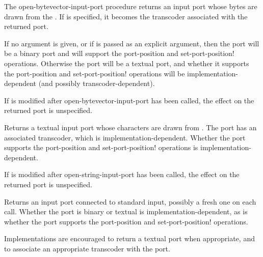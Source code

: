 \begin{entry}{%
}

   
The {\cf open-bytevector-input-port} procedure returns an input port whose bytes are drawn from the
.
If  is specified, it becomes the transcoder associated
with the returned port.

If no  argument is given, or
if \schfalse{} is passed as an explicit argument,
then the port will be a binary port and will support the
{\cf port-position} and {\cf set-port-position!}  operations.
Otherwise the port will be a textual port, and whether it supports
the {\cf port-position} and {\cf set-port-position!} operations
will be implementation-dependent (and possibly transcoder-dependent).

If  is modified after {\cf open-\linebreak[0]bytevector-\linebreak[0]input-\linebreak[0]port}
has been called, the effect on the returned
port is unspecified.
\end{entry}

\begin{entry}{%
}

Returns a textual input port whose characters are drawn from
.  The port has an associated transcoder, which is implementation-dependent.
Whether the port supports
the {\cf port-position} and {\cf set-port-position!} operations
is implementation-dependent.

If  is modified after {\cf open-string-input-port}
has been called, the effect on the returned port is unspecified.
\end{entry}

\begin{entry}{%
}
   
Returns an input port connected to standard input, possibly a fresh
one on each call.
Whether the port is binary or textual is implementation-dependent,
as is whether the port supports
the {\cf port-position} and {\cf set-port-position!} operations.

\begin{note}
  Implementations are encouraged to return a textual port when
  appropriate, and
  to associate an appropriate transcoder with the port.
\end{note}
\end{entry}

